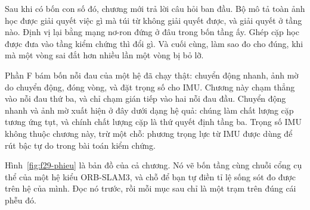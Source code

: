 \documentclass[../../deep_learning.tex]{subfiles}
\begin{document}
Sau khi có bốn con số đó, chương mới trả lời câu hỏi ban đầu. Bộ mô tả toàn ảnh học được giải quyết việc gì mà túi từ không giải quyết được, và giải quyết ở tầng nào. Định vị lại bằng mạng nơ-ron đứng ở đâu trong bốn tầng ấy. Ghép cặp học được đưa vào tầng kiểm chứng thì đổi gì. Và cuối cùng, làm sao đo cho đúng, khi mà một vòng sai đắt hơn nhiều lần một vòng bị bỏ lỡ.

Phần F bám bốn nỗi đau của một hệ đã chạy thật: chuyển động nhanh, ảnh mờ do chuyển động, đóng vòng, và đặt trọng số cho IMU. Chương này chạm thẳng vào nỗi đau thứ ba, và chỉ chạm gián tiếp vào hai nỗi đau đầu. Chuyển động nhanh và ảnh mờ xuất hiện ở đây dưới dạng hệ quả: chúng làm chất lượng cặp tương ứng tụt, và chính chất lượng cặp là thứ quyết định tầng ba. Trọng số IMU không thuộc chương này, trừ một chỗ: phương trọng lực từ IMU được dùng để rút bậc tự do trong bài toán kiểm chứng.

Hình~\ref{fig:f29-phieu} là bản đồ của cả chương. Nó vẽ bốn tầng cùng chuỗi cổng cụ thể của một hệ kiểu ORB-SLAM3, và chỗ để bạn tự điền tỉ lệ sống sót đo được trên hệ của mình. Đọc nó trước, rồi mỗi mục sau chỉ là một trạm trên đúng cái phễu đó.
\end{document}
